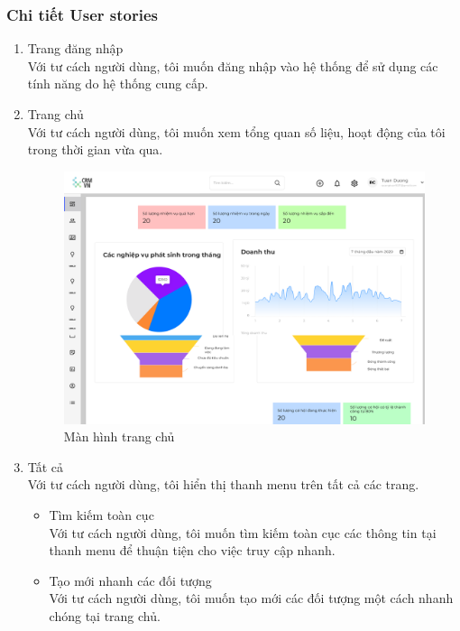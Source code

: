 \documentclass[12pt,a4paper]{article}
\begin{document}
    \subsubsection{Chi tiết User stories}
    \begin{enumerate}
        \item Trang đăng nhập\\
        Với tư cách người dùng, tôi muốn đăng nhập vào hệ thống để sử dụng các tính năng do hệ thống cung cấp.
        \item Trang chủ \\
        Với tư cách người dùng, tôi muốn xem tổng quan số liệu, hoạt động của tôi trong thời gian vừa qua.
        \begin{figure}[H]
            \centering \includegraphics[width=\textwidth]{Img/Nguyet/dashboard.png}
            \vspace{0.5cm}
            \caption{Màn hình trang chủ}
            \label{trangchu}
        \end{figure}
        \item Tất cả \\
        Với tư cách người dùng, tôi hiển thị thanh menu trên tất cả các trang.
        \begin{itemize}
            \item Tìm kiếm toàn cục\\
            Với tư cách người dùng, tôi muốn tìm kiếm toàn cục các thông tin tại thanh menu để thuận tiện cho việc truy cập nhanh.
            \item Tạo mới nhanh các đối tượng \\
            Với tư cách người dùng, tôi muốn tạo mới các đối tượng một cách nhanh chóng tại trang chủ.

\end{itemize}
\end{enumerate}
\end{document}
